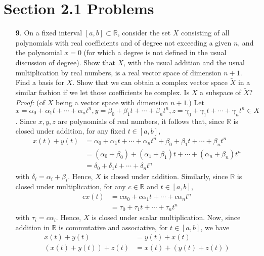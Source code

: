 \documentclass{article}
\begin{document}
\section*{Section 2.1 Problems}
\begin{itemize}
    \item[\textbf{9}.] On a fixed interval $[a,b] \subset \mathbb{R}$, consider the set $X$ consisting of all polynomials with real coefficients and of degree not exceeding a given $n$, and the polynomial $x = 0$ (for which a degree is not defined in the usual discussion of degree). Show that $X$, with the usual addition and the usual multiplication by real numbers, is a real vector space of dimension $n + 1$. Find a basis for $X$. Show that we can obtain a complex vector space $\tilde{X}$ in a similar fashion if we let those coefficients be complex. Is $X$ a subspace of $\tilde{X}$?
    \newline\newline
    \textit{Proof:} (of $X$ being a vector space with dimension $n+1$.) Let $x = \alpha_0 + \alpha_1t + \cdots + \alpha_nt^n, y = \beta_0 + \beta_1t + \cdots + \beta_nt^n,z = \gamma_0 + \gamma_1t + \cdots + \gamma_nt^n \in X$. Since $x,y,z$ are polynomials of real numbers, it follows that, since $\mathbb{R}$ is closed under addition, for any fixed $t \in [a,b]$, 
    \begin{align*}
        x(t) + y(t) &= \alpha_0 + \alpha_1t + \cdots + \alpha_nt^n + \beta_0 + \beta_1t + \cdots + \beta_nt^n\\
        &= (\alpha_0 + \beta_0) + (\alpha_1 + \beta_1)t + \cdots + (\alpha_n + \beta_n)t^n\\
        &= \delta_0 + \delta_1t + \cdots + \delta_nt^n
    \end{align*}
    with $\delta_i = \alpha_i + \beta_i$. Hence, $X$ is closed under addition. Similarly, since $\mathbb{R}$ is closed under multiplication, for any $c \in \mathbb{R}$ and $t \in [a,b]$,
    \begin{align*}
        cx(t) &= c\alpha_0 + c\alpha_1t + \cdots + c\alpha_nt^n\\
        &= \tau_0 + \tau_1t + \cdots + \tau_nt^n
    \end{align*}
    with $\tau_i = c\alpha_i$. Hence, $X$ is closed under scalar multiplication. Now, since addition in $\mathbb{R}$ is commutative and associative, for $t \in [a,b]$, we have
    \begin{align*}
        x(t) + y(t) &= y(t) + x(t)\\
        (x(t) + y(t)) + z(t) &= x(t) + (y(t) + z(t))

\end{align*}
\end{itemize}
\end{document}
